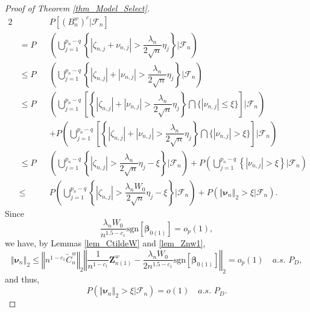 \documentclass[ejs,authoryear,linksfromyear]{imsart}
\newcommand{\znwa}{\bm{Z}_{n(1)}^w}
\numberwithin{equation}{section}
\theoremstyle{plain}
\begin{document}
\begin{proof}[Proof of Theorem \ref{thm_Model_Select}]
\begin{alignat*}{2}
	& &&P \left[ 
		\left( B_n^w \right)^c \big| \mathcal{F}_n 
	\right] \\
	&= P
	&&\left(
		\bigcup_{j=1}^{p_n - q}
		\left\{
			\left\vert
				\zeta_{n,j} + \nu_{n,j}
			\right\vert
			> \dfrac{\lambda_n}{2 \sqrt{n}} \eta_j
		\right\}
		\Bigg| \mathcal{F}_n
	\right) \\
	&\leq P
	&&\left(
		\bigcup_{j=1}^{p_n - q}
		\left\{
			\left\vert \zeta_{n,j} \right\vert
			+ \left\vert \nu_{n,j} \right\vert
			> \dfrac{\lambda_n}{2 \sqrt{n}} \eta_j
		\right\}
		\Bigg| \mathcal{F}_n
	\right) \\
	&\leq P
	&&\left(
		\bigcup_{j=1}^{p_n - q}
		\left[
			\left\{
				\left\vert \zeta_{n,j} \right\vert
				+ \left\vert \nu_{n,j} \right\vert
			> \dfrac{\lambda_n}{2 \sqrt{n}} \eta_j
			\right\}
			\bigcap
			\Big\{
				\left\vert
					\nu_{n,j}
				\right\vert
				\leq \xi
			\Big\}
		\right]
	\Bigg| \mathcal{F}_n
	\right) \\
	& &&+ P \left(
		\bigcup_{j=1}^{p_n - q}
		\left[
			\left\{
				\left\vert \zeta_{n,j} \right\vert
				+ \left\vert \nu_{n,j} \right\vert
				> \dfrac{\lambda_n}{2 \sqrt{n}} \eta_j
			\right\}
			\bigcap
			\Big\{
				\left\vert
					\nu_{n,j}
				\right\vert
				> \xi
			\Big\}
		\right]
		\Bigg| \mathcal{F}_n
	\right) \\
	&\leq P &&\left(
		\bigcup_{j=1}^{p_n - q}
		\left\{
			\left\vert \zeta_{n,j} \right\vert
			> \dfrac{\lambda_n}{2 \sqrt{n}} \eta_j - \xi
		\right\}
		\Bigg| \mathcal{F}_n
	\right)
	+ P \left(
		\bigcup_{j=1}^{p_n - q}
		\left\{
			\left\vert \nu_{n,j} \right\vert
			> \xi
		\right\}
		\Bigg| \mathcal{F}_n
	\right) \\
	&\leq && P \left(
		\bigcup_{j=1}^{p_n - q}
		\left\{
			\left\vert \zeta_{n,j} \right\vert
			> \dfrac{\lambda_n W_0}{2 \sqrt{n}} \eta_j - \xi
		\right\}
		\Bigg| \mathcal{F}_n
	\right) 
	+ P \left(
		\left\Vert \bm{\nu}_n \right\Vert_2
		> \xi
		\Big| \mathcal{F}_n
	\right).
	\end{alignat*}
	Since 
	$$
	\dfrac{\lambda_n W_0}{n^{1.5-c_1}} 
	\text{sgn} \left[ \bm{\beta}_{0(1)} \right]
	= o_p(1),
	$$
	we have, by Lemmas \ref{lem_CtildeW} and \ref{lem_Znw1},
	$$
	\left\Vert \bm{\nu}_n \right\Vert_2 
	\leq \left\Vert n^{1 - c_1} \widetilde{C}^w_n \right\Vert_2 
	\left\Vert 
	\dfrac{1}{n^{1 - c_1}} \znwa 
	- \dfrac{\lambda_n W_0}{2 n^{1.5 - c_1}} \text{sgn} \left[ \bm{\beta}_{0(1)} \right] 
	\right\Vert_2 
	= o_p(1) \quad a.s. \,\, P_D,
	$$
	and thus,
	$$
	P \left(
	\left\Vert \bm{\nu}_n \right\Vert_2
	> \xi 
	\Big| \mathcal{F}_n
	\right)
	= o(1) \quad a.s. \,\, P_D.
$$
\end{proof}
\end{document}
